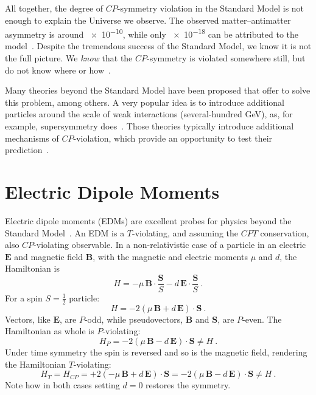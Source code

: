 All together, the degree of $CP$-symmetry violation in the Standard Model is not enough to explain the Universe we observe. The observed matter--antimatter asymmetry is around \num{e-10}, while only \num{e-18} can be attributed to the model~\cite{Riotto1999}. Despite the tremendous success of the Standard Model, we know it is not the full picture. We \emph{know} that the $CP$-symmetry is violated somewhere still, but do not know where or how~\cite{Pospelov2005}.%

Many theories beyond the Standard Model have been proposed that offer to solve this problem, among others. A very popular idea is to introduce additional particles around the scale of weak interactions (several-hundred GeV), as, for example, supersymmetry does~\cite{Supersymmetry}. Those theories typically introduce additional mechanisms of $CP$-violation, which provide an opportunity to test their prediction~\cite{Ellis1989}.



\section{Electric Dipole Moments}
Electric dipole moments (EDMs) are excellent probes for physics beyond the Standard Model~\cite{Pospelov2005}. An EDM is a $T$-violating, and assuming the $CPT$ conservation, also $CP$-violating observable. In a non-relativistic case of a particle in an electric $\mathbf{E}$ and magnetic field $\mathbf{B}$, with the magnetic and electric moments $\mu$ and $d$, the Hamiltonian is
\begin{equation}
  H = - \mu \, \mathbf{B} \cdot \frac{\mathbf{S}}{S} - d \, \mathbf{E} \cdot \frac{\mathbf{S}}{S} \ .
\end{equation}
For a spin $S = \tfrac{1}{2}$ particle:
\begin{equation}
  H = - 2 \left( \mu \, \mathbf{B} + d \, \mathbf{E} \right ) \cdot \mathbf{S} \ .
\end{equation}
Vectors, like $\mathbf{E}$, are $P$-odd, while pseudovectors, $\mathbf{B}$ and $\mathbf{S}$, are $P$-even. The Hamiltonian as whole is $P$-violating:
\begin{equation}
  H_P = - 2 \left( \mu \, \mathbf{B} - d \, \mathbf{E} \right ) \cdot \mathbf{S} \neq H \ .
\end{equation}
Under time symmetry the spin is reversed and so is the magnetic field, rendering the Hamiltonian $T$-violating:
\begin{equation}
  H_T = H_{CP} = + 2 \left( - \mu \, \mathbf{B} + d \, \mathbf{E} \right ) \cdot \mathbf{S} = - 2 \left( \mu \, \mathbf{B} - d \, \mathbf{E} \right ) \cdot \mathbf{S} \neq H \ .
\end{equation}
Note how in both cases setting $d = 0$ restores the symmetry.

